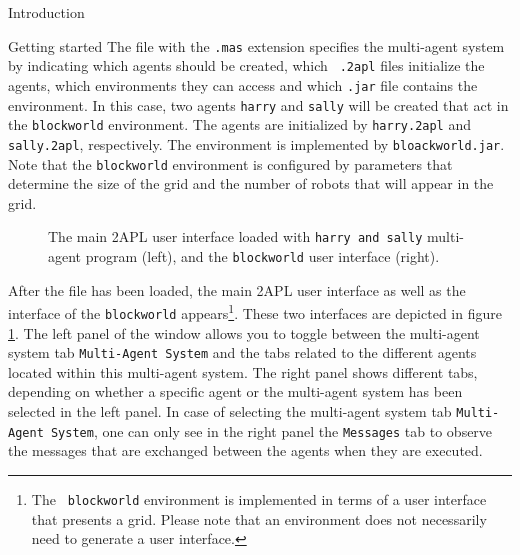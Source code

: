 \begin{chapter}{Introduction}
\begin{section}{Getting started}
The file with the {\tt .mas} extension specifies the multi-agent
system by indicating which agents should be created, which {\tt
.2apl} files initialize the agents, which environments they can
access and which {\tt .jar} file contains the environment. In this
case, two agents {\tt harry} and {\tt sally} will be created that
act in the {\tt blockworld} environment. The agents are initialized
by {\tt harry.2apl} and {\tt sally.2apl}, respectively. The
environment is implemented by {\tt bloackworld.jar}. Note that the
{\tt blockworld} environment is configured by parameters that
determine the size of the grid and the number of robots that will
appear in the grid.

\begin{figure}
    \begin{minipage}{0.6\linewidth}
        \begin{center}
        \end{center}
    \end{minipage}
    \hspace{.5cm}
    \begin{minipage}{0.3\linewidth}
        \begin{center}
        \end{center}
    \end{minipage}
    \caption{The main 2APL user interface loaded with {\tt harry and sally} multi-agent program (left), and the {\tt blockworld} user interface (right).}\label{fig:loadedmas}
\end{figure}

After the file has been loaded, the main 2APL user interface as well
as the interface of the {\tt blockworld} appears\footnote{The {\tt
blockworld} environment is implemented in terms of a user interface
that presents a grid. Please note that an environment does not
necessarily need to generate a user interface.}. These two
interfaces are depicted in figure \ref{fig:loadedmas}. The left
panel of the window allows you to toggle between the multi-agent
system tab {\tt Multi-Agent System} and the tabs related to the
different agents located within this multi-agent system. The right
panel shows different tabs, depending on whether a specific agent or
the multi-agent system has been selected in the left panel. In case
of selecting the multi-agent system tab {\tt Multi-Agent System},
one can only see in the right panel the {\tt Messages} tab to
observe the messages that are exchanged between the agents when they
are executed.


\end{section}
\end{chapter}
